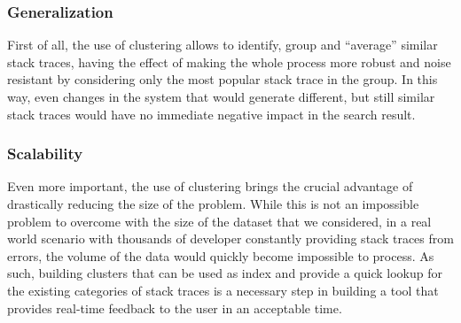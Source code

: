 \subsubsection{Generalization}
First of all, the use of clustering allows to identify, group and ``average'' similar stack traces, having the effect of making the whole process more robust and noise resistant by considering only the most popular stack trace in the group.
In this way, even changes in the system that would generate different, but still similar stack traces would have no immediate negative impact in the search result.


\subsubsection{Scalability}
Even more important, the use of clustering brings the crucial advantage of drastically reducing the size of the problem.
While this is not an impossible problem to overcome with the size of the dataset that we considered, in a real world scenario with thousands of developer constantly providing stack traces from errors, the volume of the data would quickly become impossible to process.
As such, building clusters that can be used as index and provide a quick lookup for the existing categories of stack traces is a necessary step in building a tool that provides real-time feedback to the user in an acceptable time.


